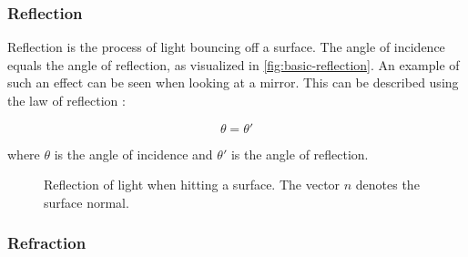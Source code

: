 \subsubsection{Reflection}

Reflection is the process of light bouncing off a surface. The angle of incidence equals the angle of reflection, as visualized in \autoref{fig:basic-reflection}. An example of such an effect can be seen when looking at a mirror. This can be described using the law of reflection \cite{fowles1989introduction}:

\begin{equation}
  \label{eqn:law-of-reflection}
  \theta = \theta'
\end{equation}

where $\theta$ is the angle of incidence and $\theta'$ is the angle of reflection.

\begin{figure}[H]
  \centering
  \caption{Reflection of light when hitting a surface. The vector $n$ denotes the surface normal.}
  \label{fig:basic-reflection}
\end{figure}

\subsubsection{Refraction}

